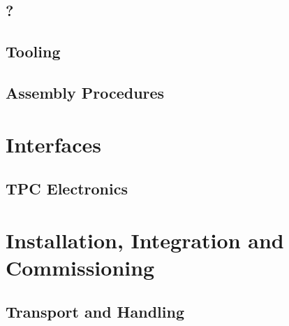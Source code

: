 \subsection{?}
\label{sec:fddp-daq-??}


\subsection{Tooling}
\label{sec:fddp-daq-tooling}


\subsection{Assembly Procedures}
\label{sec:fddp-daq-assy}



\section{Interfaces}
\label{sec:fddp-daq-intfc}



\subsection{TPC Electronics}
\label{sec:fddp-daq-intfc-elec}


\subsection{}
\label{sec:fddp-daq-intfc-?}


\section{Installation, Integration and Commissioning}
\label{sec:fddp-daq-install}

\subsection{Transport and Handling}
\label{sec:fddp-daq-install-transport}


